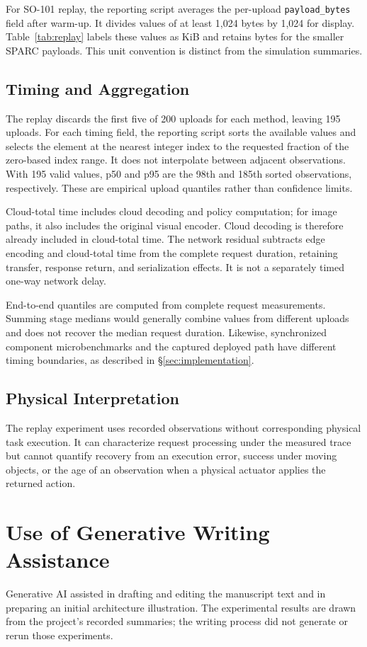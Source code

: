 For SO-101 replay, the reporting script averages the per-upload
\texttt{payload\_bytes} field after warm-up. It divides values of at
least 1,024 bytes by 1,024 for display. Table~\ref{tab:replay} labels
these values as KiB and retains bytes for the smaller SPARC payloads.
This unit convention is distinct from the simulation summaries.

\subsection{Timing and Aggregation}
The replay discards the first five of 200 uploads for each method,
leaving 195 uploads. For each timing field, the reporting script sorts
the available values and selects the element at the nearest integer
index to the requested fraction of the zero-based index range. It does
not interpolate between adjacent observations. With 195 valid values,
p50 and p95 are the 98th and 185th sorted observations, respectively.
These are empirical upload quantiles rather than confidence limits.

Cloud-total time includes cloud decoding and policy computation; for
image paths, it also includes the original visual encoder. Cloud
decoding is therefore already included in cloud-total time. The network
residual subtracts edge encoding and cloud-total time from the complete
request duration, retaining transfer, response return, and serialization
effects. It is not a separately timed one-way network delay.

End-to-end quantiles are computed from complete request measurements.
Summing stage medians would generally combine values from different
uploads and does not recover the median request duration. Likewise,
synchronized component microbenchmarks and the captured deployed path
have different timing boundaries, as described in
\S\ref{sec:implementation}.

\subsection{Physical Interpretation}
The replay experiment uses recorded observations without corresponding
physical task execution. It can characterize request processing under
the measured trace but cannot quantify recovery from an execution error,
success under moving objects, or the age of an observation when a
physical actuator applies the returned action.

\section{Use of Generative Writing Assistance}
Generative AI assisted in drafting and editing the manuscript text and
in preparing an initial architecture illustration. The experimental
results are drawn from the project's recorded summaries; the writing
process did not generate or rerun those experiments.
